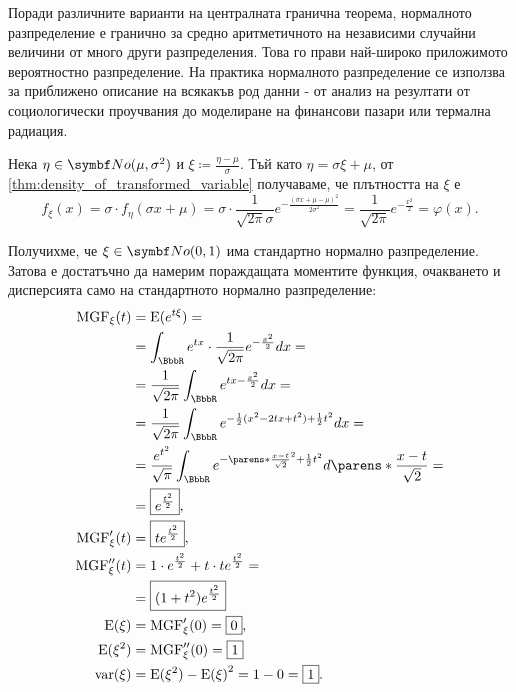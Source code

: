 \documentclass{../../common/topic}
\begin{document}
Поради различните варианти на централната гранична теорема, нормалното разпределение е гранично за средно аритметичното на независими случайни величини от много други разпределения. Това го прави най-широко приложимото вероятностно разпределение. На практика нормалното разпределение се използва за приближено описание на всякакъв род данни - от анализ на резултати от социологически проучвания до моделиране на финансови пазари или термална радиация.

Нека \( \eta \in \distr{No}(\mu, \sigma^2) \) и \( \xi \coloneqq \frac {\eta - \mu} \sigma \). Тъй като \( \eta = \sigma \xi + \mu \), от \cref{thm:density_of_transformed_variable} получаваме, че плътността на \( \xi \) е
\begin{equation*}
  f_\xi(x)
  =
  \sigma \cdot f_\eta(\sigma x + \mu)
  =
  \sigma \cdot \frac 1 {\sqrt{2\pi} \sigma} e^{-\frac{{(\sigma x + \mu -\mu)}^2} {2\sigma^2}}
  =
  \frac 1 {\sqrt{2\pi}} e^{-\frac {x^2} 2}
  =
  \varphi(x).
\end{equation*}

Получихме, че \( \xi \in \distr{No}(0, 1) \) има стандартно нормално разпределение. Затова е достатъчно да намерим пораждащата моментите функция, очакването и дисперсията само на стандартното нормално разпределение:
\begingroup
\allowdisplaybreaks
\begin{align*}
  \MGF_\xi(t)
  &=
  \Expect(e^{t\xi})
  = \\ &=
  \int_{\BbbR} e^{tx} \cdot \frac 1 {\sqrt{2\pi}} e^{-\frac {x^2} 2} dx
  = \\ &=
  \frac 1 {\sqrt{2\pi}} \int_{\BbbR} e^{tx -\frac {x^2} 2} dx
  = \\ &=
  \frac 1 {\sqrt{2\pi}} \int_{\BbbR} e^{- \frac 1 2 (x^2 - 2tx + t^2) + \frac 1 2 t^2} dx
  = \\ &=
  \frac {e^{t^2}} {\sqrt \pi} \int_{\BbbR} e^{- {\parens*{\frac {x - t} {\sqrt 2} }}^2 + \frac 1 2 t^2} d\parens*{ \frac {x - t} {\sqrt 2} }
  = \\ &=
  \boxed{e^{\frac {t^2} 2}},
  \\
  \MGF'_\xi(t)
  &=
  \boxed{t e^{\frac {t^2} 2}},
  \\
  \MGF''_\xi(t)
  &=
  1 \cdot e^{\frac {t^2} 2} + t \cdot t e^{\frac {t^2} 2}
  = \\ &=
  \boxed{(1 + t^2) e^{\frac {t^2} 2}}
  \\
  \Expect(\xi)
  &=
  \MGF'_\xi(0)
  =
  \boxed{0},
  \\
  \Expect(\xi^2)
  &=
  \MGF''_\xi(0)
  =
  \boxed{1}
  \\
  \var(\xi)
  &=
  \Expect(\xi^2) - {\Expect(\xi)}^2
  =
  1 - 0
  =
  \boxed{1}.
\end{align*}
\endgroup
\end{document}
